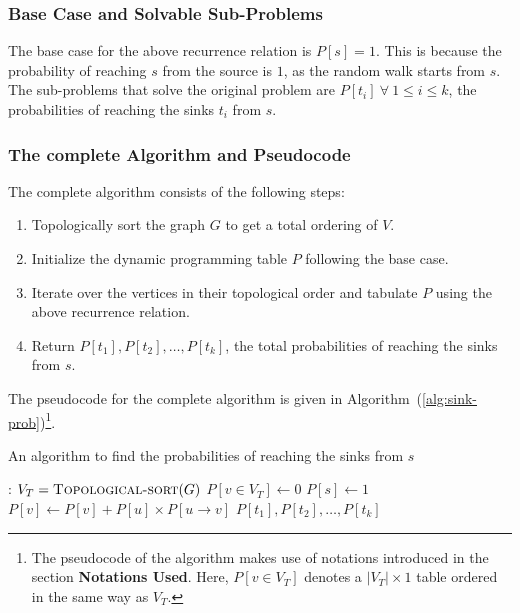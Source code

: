 \documentclass[12pt]{report}
\begin{document}
    \subsubsection*{Base Case and Solvable Sub-Problems}
    The base case for the above recurrence relation is $P[s] = 1$.
    This is because the probability of reaching $s$ from the source is $1$, as the random walk starts from $s$.
    \vspace*{10pt} \\
    The sub-problems that solve the original problem are $P[t_{i}] \ \forall \ 1 \leq i \leq k$, the probabilities of reaching the sinks $t_{i}$ from $s$.

    \subsubsection*{The complete Algorithm and Pseudocode}
    The complete algorithm consists of the following steps:
    \begin{enumerate}
        \item Topologically sort the graph $G$ to get a total ordering of $V$.
        \item Initialize the dynamic programming table $P$ following the base case.
        \item Iterate over the vertices in their topological order and tabulate $P$ using the above recurrence relation.
        \item Return $P[t_{1}], P[t_{2}], \dots, P[t_{k}]$, the total probabilities of reaching the sinks from $s$.
    \end{enumerate}
    The pseudocode for the complete algorithm is given in Algorithm~(\ref{alg:sink-prob})\footnote{
        The pseudocode of the algorithm makes use of notations introduced in the section \textbf{Notations Used}.
        Here, $P[v \in V_{T}]$ denotes a $|V_{T}| \times 1$ table ordered in the same way as $V_{T}$.
    }.

    \begin{algorithm}
        \caption{An algorithm to find the probabilities of reaching the sinks from $s$}
        \label{alg:sink-prob}
        \begin{algorithmic}[1]
            :
                \State $V_{T} = \Call{Topological-sort}{G}$
                \State $P[v \in V_{T}] \gets 0$
                \State $P[s] \gets 1$
                        \State $P[v] \gets P[v] + P[u] \times P[u \to v]$
                    \EndFor
                \EndFor
                \State \Return $P[t_{1}], P[t_{2}], \dots, P[t_{k}]$
            \EndProcedure
        \end{algorithmic}
    \end{algorithm}
\end{document}
